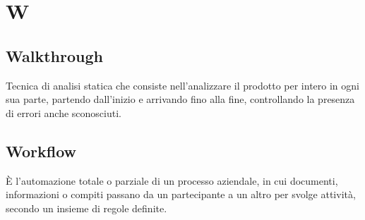 \section{W}
	\subsection{Walkthrough} 
		Tecnica di analisi statica che consiste nell'analizzare il prodotto per intero in ogni sua parte, partendo dall’inizio e arrivando fino alla fine, controllando la presenza di errori anche sconosciuti.
	\subsection{Workflow}  
		È l’automazione totale o parziale di un processo aziendale, in cui documenti, informazioni o compiti passano da un partecipante a un altro per svolge attività, secondo un insieme di regole definite.
